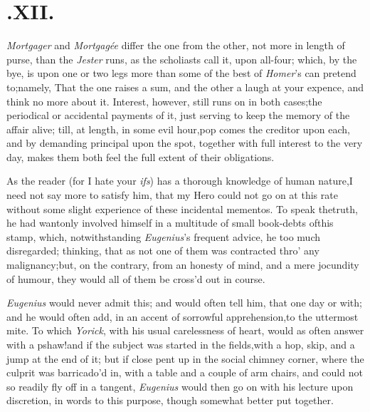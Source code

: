 \documentclass{article}
\begin{document}
\vfill

\section{.\enspace XII.}

 \textit{Mortgager} and \textit{Mortgagée}\break 
differ the one from the other, not more in length
of purse, than the \textit{Jester} 
runs, as the
scholiasts call it, upon all-four; which, by the bye, is upon one
or two legs more than some of the best of \textit{Homer}’s can
pretend to;\tsk  namely, That the one raises a sum, and the other
a laugh at your expence, and think no more about it. Interest,
however, still runs on in both cases;\tsk  the periodical or
accidental payments of it, just serving to keep the memory of the
affair alive; till, at length, in some evil hour,\tsk pop comes the
creditor upon each, and by demanding principal upon the spot,
together with full interest to the very day, makes them both feel
the full extent of their obligations.

As the reader (for I hate your \textit{ifs}) has a thorough
knowledge of human nature,\break I need not say more to satisfy him, that my
Hero could not go on at this rate without some
slight experience of these incidental mementos. To speak the\break truth,
he had wantonly involved himself in a multitude of small book-debts
of\break this stamp, which, notwithstanding \textit{Eu\-genius}’s
frequent advice, he too much disregarded; thinking, that as not one
of them was contracted thro’ any malignancy;\tsk  but, on
the contrary, from an honesty of mind, and a mere jocundity of
humour, they would all of them be cross’d out in course.

\textit{Eugenius} would never admit this; and would often tell
him, that one day or 
with; and he would often add, in an accent of sorrowful apprehension,\tsk  to the
uttermost mite. To which \textit{Yorick}, with his usual carelessness of heart,
would as often answer with a pshaw!\tsk  and if the subject was started in the
fields,\tsk  with a hop, skip, and a jump at the end of it; but if close pent up in
the social chimney corner, where the culprit was barri\-ca\-do’d in, with a table
and a couple of arm chairs, and could not so readily fly off in a tangent,\tsk
\textit{Eugenius} would then go on with his lecture upon
discretion, in words to
this purpose, though somewhat better put together.
\end{document}
